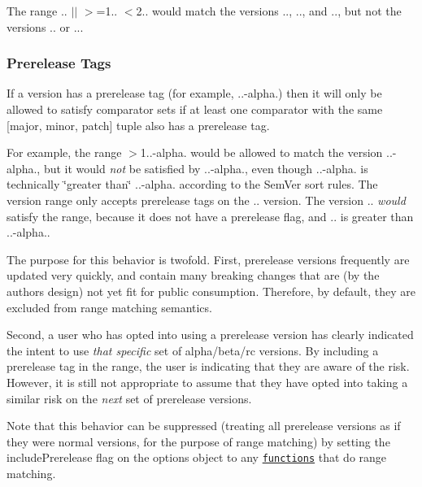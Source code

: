 The range {.. $\vert$$\vert$ $>$=1.. $<$2..} would match the versions {..}, {..}, and {..}, but not the versions {..} or {..}.

\subsubsection*{Prerelease Tags}

If a version has a prerelease tag (for example, {..-\/alpha.}) then it will only be allowed to satisfy comparator sets if at least one comparator with the same {\ttfamily \mbox{[}major, minor, patch\mbox{]}} tuple also has a prerelease tag.

For example, the range {\ttfamily $>$1..-\/alpha.} would be allowed to match the version {..-\/alpha.}, but it would {\itshape not} be satisfied by {..-\/alpha.}, even though {..-\/alpha.} is technically \char`\"{}greater
than\char`\"{} {..-\/alpha.} according to the Sem\+Ver sort rules. The version range only accepts prerelease tags on the {..} version. The version {..} {\itshape would} satisfy the range, because it does not have a prerelease flag, and {..} is greater than {..-\/alpha.}.

The purpose for this behavior is twofold. First, prerelease versions frequently are updated very quickly, and contain many breaking changes that are (by the author\textquotesingle{}s design) not yet fit for public consumption. Therefore, by default, they are excluded from range matching semantics.

Second, a user who has opted into using a prerelease version has clearly indicated the intent to use {\itshape that specific} set of alpha/beta/rc versions. By including a prerelease tag in the range, the user is indicating that they are aware of the risk. However, it is still not appropriate to assume that they have opted into taking a similar risk on the {\itshape next} set of prerelease versions.

Note that this behavior can be suppressed (treating all prerelease versions as if they were normal versions, for the purpose of range matching) by setting the {\ttfamily include\+Prerelease} flag on the options object to any \href{https://github.com/npm/node-semver#functions}{\tt functions} that do range matching.

